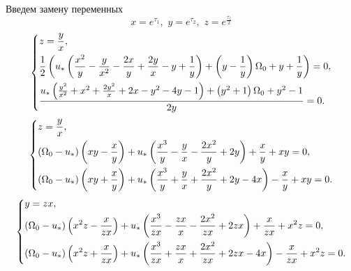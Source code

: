 \documentclass[a4paper,14pt]{article}
\theoremstyle{plain} %
\theoremstyle{definition} %
\theoremstyle{remark} %
\begin{document}
{Введем замену переменных
\[
    x=e^{\tau_1} ,\,\,y=e^{\tau_2} ,\,\,z=e^{\frac{\tau_f}{2}}
\]
\[
    \left\{ {\begin{aligned}
                 & z=\frac{y}{x}, \hfill                                                         \\
                 & \frac{1}{2} \left(u_* \left(\frac{x^2}{y}-\frac{y}{x^2}-\frac{2 x}{y}+\frac{2
                        y}{x}-y+\frac{1}{y}\right)+\left(y-\frac{1}{y}\right) \Omega
                _0+y+\frac{1}{y}\right)=0, \hfill                                                \\
                 & \frac{u_* \left(\frac{y^2}{x^2}+x^2+\frac{2 y^2}{x}+2 x-y^2-4
                y-1\right)+\left(y^2+1\right) \Omega _0+y^2-1}{2 y}=0. \hfill                    \\
            \end{aligned}} \right.
\]
\begin{equation}\label{fullchanged}
    \left\{ {\begin{aligned}
                 & z=\frac{y}{x}, \hfill                                                                                                              \\
                 & (\Omega_0-u_*)\left( xy-\frac{x}{y}\right)+u_*\left(\frac{x^3}{y}-\frac{y}{x}-\frac{2x^2}{y}+2y\right)+\frac{x}{y}+xy=0, \hfill    \\
                 & (\Omega_0-u_*)\left( xy+\frac{x}{y}\right)+u_*\left(\frac{x^3}{y}+\frac{y}{x}+\frac{2x^2}{y}+2y-4x\right)-\frac{x}{y}+xy=0. \hfill \\
            \end{aligned}} \right.
\end{equation}
\begin{equation}\label{fullchanged1}
    \left\{ {\begin{aligned}
                 & y=zx, \hfill                                                                                                              \\
                 & (\Omega_0-u_*)\left( x^2z-\frac{x}{zx}\right)+u_*\left(\frac{x^3}{zx}-\frac{zx}{x}-\frac{2x^2}{zx}+2zx\right)+\frac{x}{zx}+x^2z=0, \hfill    \\
                 & (\Omega_0-u_*)\left( x^2z+\frac{x}{zx}\right)+u_*\left(\frac{x^3}{zx}+\frac{zx}{x}+\frac{2x^2}{zx}+2zx-4x\right)-\frac{x}{zx}+x^2z=0. \hfill \\
            \end{aligned}} \right.
\end{equation}
}
\end{document}
